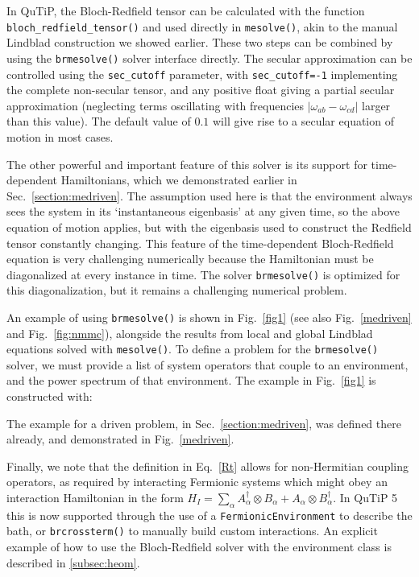 \documentclass[preprint,3p,sort&compress]{elsarticle}
\def\code#1{\texttt{#1}}
\newcommand{\fig}[1]{Fig.~\ref{#1}}
\begin{document}
In QuTiP, the Bloch-Redfield tensor can be calculated with the function \code{bloch\_redfield\_tensor()} and used directly in \code{mesolve()}, akin to the manual Lindblad construction we showed earlier. These two steps can be combined by using the \code{brmesolve()} solver interface directly.  The secular approximation can be controlled using the \code{sec\_cutoff} parameter, with \code{sec\_cutoff=-1} implementing the complete non-secular tensor, and any positive float giving a partial secular approximation (neglecting terms oscillating with frequencies $|\omega_{ab} - \omega_{cd}|$ larger than this value).  The default value of $0.1$ will give rise to a secular equation of motion in most cases.

The other powerful and important feature of this solver is its support for time-dependent Hamiltonians, which we demonstrated earlier in Sec.~\ref{section:medriven}. The assumption used here is that the environment always sees the system in its `instantaneous eigenbasis' at any given time, so the above equation of motion applies, but with the eigenbasis used to construct the Redfield tensor constantly changing. This feature of the time-dependent Bloch-Redfield equation is very challenging numerically because the Hamiltonian must be diagonalized at every instance in time.  The solver \code{brmesolve()} is optimized for this diagonalization, but it remains a challenging numerical problem.

An example of using \code{brmesolve()} is shown in \fig{fig1} (see also \fig{medriven} and \fig{fig:nmmc}), alongside the results from local and global Lindblad equations solved with \code{mesolve()}. To define a problem for the \code{brmesolve()} solver, we must provide a list of system operators that couple to an environment, and the power spectrum of that environment. The example in \fig{fig1} is constructed with:
\newpage
{}

The example for a driven problem, in Sec.~\ref{section:medriven}, was defined there already, and demonstrated in \fig{medriven}.

Finally, we note that the definition in Eq.~\eqref{Rt} allows for non-Hermitian coupling operators, as required by interacting Fermionic systems which might obey an interaction Hamiltonian in the form $H_I = \sum_\alpha A^\dagger_\alpha \otimes B_\alpha + A_\alpha \otimes B^\dagger_\alpha$. In QuTiP 5 this is now supported through the use of a \code{FermionicEnvironment} to describe the bath, or \code{brcrossterm()} to manually build custom interactions. An explicit example of how to use the Bloch-Redfield solver with the environment class is described in \ref{subsec:heom}.
\end{document}
